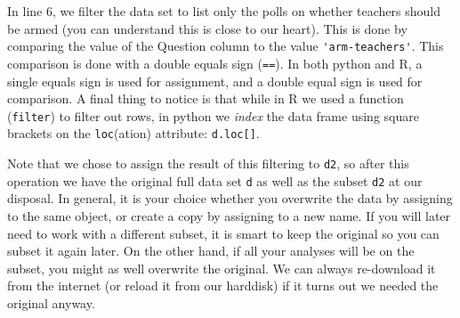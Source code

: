 In line 6, we filter the data set to list only the polls on whether teachers should be armed
(you can understand this is close to our heart).
This is done by comparing the value of the Question column to the value \verb+'arm-teachers'+.
This comparison is done with a double equals sign (\verb+==+).
In both python and R, a single equals sign is used for assignment,
and a double equal sign is used for comparison.
A final thing to notice is that while in R we used a function (\verb+filter+) to filter out rows,
in python we \emph{index} the data frame using square brackets on the \verb+loc+(ation) attribute: \verb+d.loc[]+.

Note that we chose to assign the result of this filtering to \verb+d2+,
so after this operation we have the original full data set \verb+d+ as well as the subset \verb+d2+ at our disposal.
In general, it is your choice whether you overwrite the data by assigning to the same object,
or create a copy by assigning to a new name.
If you will later need to work with a different subset, it is smart to keep the original so you can subset it again later.
On the other hand, if all your analyses will be on the subset, you might as well overwrite the original.
We can always re-download it from the internet (or reload it from our harddisk) if it turns out we needed the original anyway. 




